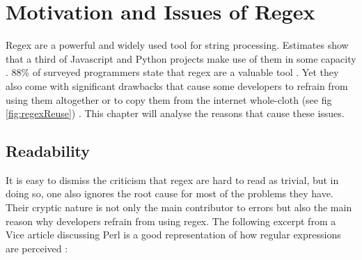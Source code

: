 \chapter{Motivation and Issues of Regex} \label{chapter:motivation}

Regex are a powerful and widely used tool for string processing. Estimates show that a third of Javascript and Python projects make use of them in some capacity \cite{RedosInPractice}. 88\% of surveyed programmers state that regex are a valuable tool \cite{RegexesAreHard}. Yet they also come with significant drawbacks that cause some developers to refrain from using them altogether or to copy them from the internet whole-cloth (see fig \ref{fig:regexReuse}) \cite{RegexesAreHard}. This chapter will analyse the reasons that cause these issues.

{
\hypersetup{citecolor=white}
\begin{boxFigure}[label=fig:regexReuse,title={Percentage of reused regex. Based on \cite{RegexNotLinguaFranca} figure 2.},width=15cm]
    \centering
\end{boxFigure}
}


\section{Readability}

It is easy to dismiss the criticism that regex are hard to read as trivial, but in doing so, one also ignores the root cause for most of the problems they have. Their cryptic nature is not only the main contributor to errors but also the main reason why developers refrain from using regex. The following excerpt from a Vice article discussing Perl is a good representation of how regular expressions are perceived \cite{ViceProgrammingLanguagesProgrammersHate}:

